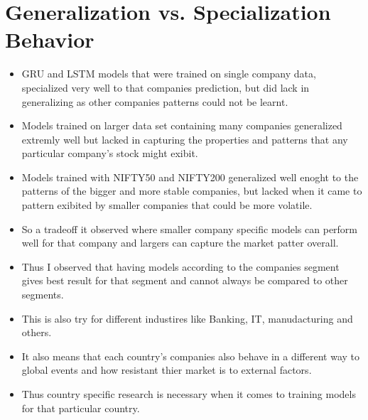 \FloatBarrier

\clearpage
\FloatBarrier
\section{Generalization vs. Specialization Behavior}

\begin{itemize}
  \item GRU and LSTM models that were trained on single company data, specialized very well to that companies prediction, but did lack in generalizing as other companies patterns could not be learnt.
  \item Models trained on larger data set containing many companies generalized extremly well but lacked in capturing the properties and patterns that any particular company's stock might exibit.
  \item Models trained with NIFTY50 and NIFTY200 generalized well enoght to the patterns of the bigger and more stable companies, but lacked when it came to pattern exibited by smaller companies that could be more volatile.
  \item So a tradeoff it observed where smaller company specific models can perform well for that company and largers can capture the market patter overall.
  \item Thus I observed that having models according to the companies segment gives best result for that segment and cannot always be compared to other segments.
  \item This is also try for different industires like Banking, IT, manudacturing and others.
  \item It also means that each country's companies also behave in a different way to global events and how resistant thier market is to external factors.
  \item Thus country specific research is necessary when it comes to training models for that particular country.
\end{itemize}

\FloatBarrier

\clearpage
\FloatBarrier
